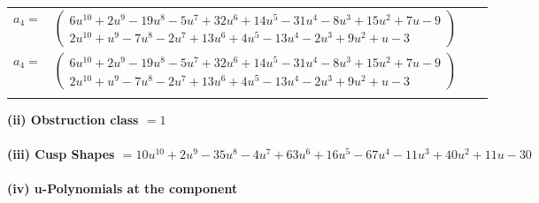 \documentclass[1p]{elsarticle_modified}
\theoremstyle{definition}
\begin{document}
\begin{tabular}{m{7pt} m{180pt} m{7pt} m{180pt} }
\flushright $a_{4}=$&$\begin{pmatrix}6 u^{10}+2 u^9-19 u^8-5 u^7+32 u^6+14 u^5-31 u^4-8 u^3+15 u^2+7 u-9\\2 u^{10}+u^9-7 u^8-2 u^7+13 u^6+4 u^5-13 u^4-2 u^3+9 u^2+u-3\end{pmatrix}$\\ \flushright $a_{4}=$&$\begin{pmatrix}6 u^{10}+2 u^9-19 u^8-5 u^7+32 u^6+14 u^5-31 u^4-8 u^3+15 u^2+7 u-9\\2 u^{10}+u^9-7 u^8-2 u^7+13 u^6+4 u^5-13 u^4-2 u^3+9 u^2+u-3\end{pmatrix}$\\&\end{tabular}
\flushleft \textbf{(ii) Obstruction class $= 1$}\\~\\
\flushleft \textbf{(iii) Cusp Shapes $= 10 u^{10}+2 u^9-35 u^8-4 u^7+63 u^6+16 u^5-67 u^4-11 u^3+40 u^2+11 u-30$}\\~\\
\newpage\renewcommand{\arraystretch}{1}
\flushleft \textbf{(iv) u-Polynomials at the component}\newline \\
\end{document}
